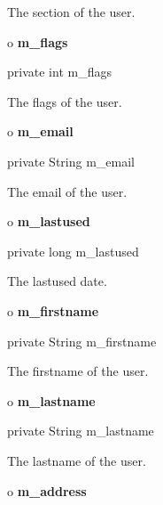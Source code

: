 \begin{description}
\htmlDD The section of the user.

\end{description}

o {\bf m\_flags} 

\begin{PRE}
 private int m\_flags
\end{PRE}

\begin{description}
\htmlDD The flags of the user.

\end{description}

o {\bf m\_email} 

\begin{PRE}
 private String m\_email
\end{PRE}

\begin{description}
\htmlDD The email of the user.

\end{description}

o {\bf m\_lastused} 

\begin{PRE}
 private long m\_lastused
\end{PRE}

\begin{description}
\htmlDD The lastused date.

\end{description}

o {\bf m\_firstname} 

\begin{PRE}
 private String m\_firstname
\end{PRE}

\begin{description}
\htmlDD The firstname of the user.

\end{description}

o {\bf m\_lastname} 

\begin{PRE}
 private String m\_lastname
\end{PRE}

\begin{description}
\htmlDD The lastname of the user.

\end{description}

o {\bf m\_address} 

